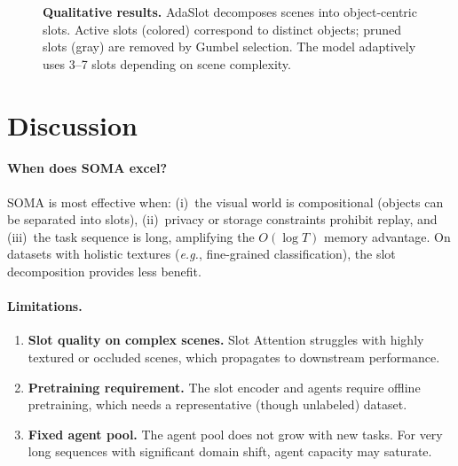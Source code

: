 \documentclass{article}
\newcommand{\eg}{\textit{e.g.}}
\begin{document}
\begin{figure}[t]
    \centering
    \caption{\textbf{Qualitative results.} AdaSlot decomposes scenes into object-centric slots. Active slots (colored) correspond to distinct objects; pruned slots (gray) are removed by Gumbel selection. The model adaptively uses 3--7 slots depending on scene complexity.}
    \label{fig:vis}
\end{figure}


\section{Discussion}
\label{sec:discussion}

\paragraph{When does SOMA excel?}
SOMA is most effective when:
(i)~the visual world is compositional (objects can be separated into slots),
(ii)~privacy or storage constraints prohibit replay, and
(iii)~the task sequence is long, amplifying the $O(\log T)$ memory advantage.
On datasets with holistic textures (\eg, fine-grained classification), the slot decomposition provides less benefit.

\paragraph{Limitations.}
\begin{enumerate}
    \item \textbf{Slot quality on complex scenes.} Slot Attention struggles with highly textured or occluded scenes, which propagates to downstream performance.
    \item \textbf{Pretraining requirement.} The slot encoder and agents require offline pretraining, which needs a representative (though unlabeled) dataset.
    \item \textbf{Fixed agent pool.} The agent pool does not grow with new tasks. For very long sequences with significant domain shift, agent capacity may saturate.
\end{enumerate}
\end{document}
